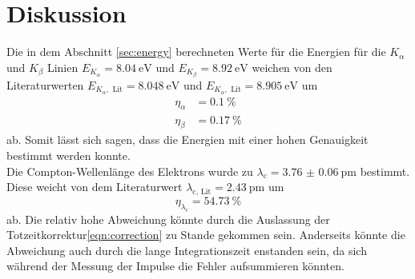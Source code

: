 \section{Diskussion}
\label{sec:Diskussion}
Die in dem Abschnitt \ref{sec:energy} berechneten Werte für die Energien für die $K_\alpha$ und $K_\beta$ Linien
$E_{K_\alpha} = \SI{8.04}{\electronvolt}$ und $E_{K_\beta} = \SI{8.92}{\electronvolt}$ weichen von den Literaturwerten
$E_{K_\alpha, \text{ Lit}} = \SI{8.048}{\electronvolt}$\cite{litlinien} und $E_{K_\alpha, \text{ Lit}} = \SI{8.905}{\electronvolt}$\cite{litlinien} um
\begin{align*}
    \eta_\alpha &= \SI{0.1}{\percent} \\
    \eta_\beta  &= \SI{0.17}{\percent}
\end{align*}
ab. 
Somit lässt sich sagen, dass die Energien mit einer hohen Genauigkeit bestimmt werden konnte.\\
Die Compton-Wellenlänge des Elektrons wurde zu $\lambda_\text{c} = \SI{3.76(6)}{\pico\metre}$ bestimmt. 
Diese weicht von dem Literaturwert $\lambda_\text{c, Lit} = \SI{2.43}{\pico\metre}$\cite{compton} um 
\begin{equation*}
    \eta_{\lambda_\text{c}} = \SI{54.73}{\percent}
\end{equation*}
ab.  
Die relativ hohe Abweichung könnte durch die Auslassung der Totzeitkorrektur\eqref{eqn:correction} zu Stande gekommen sein.
Anderseits könnte die Abweichung auch durch die lange Integrationszeit enstanden sein, da sich während der Messung der Impulse 
die Fehler aufsummieren könnten.